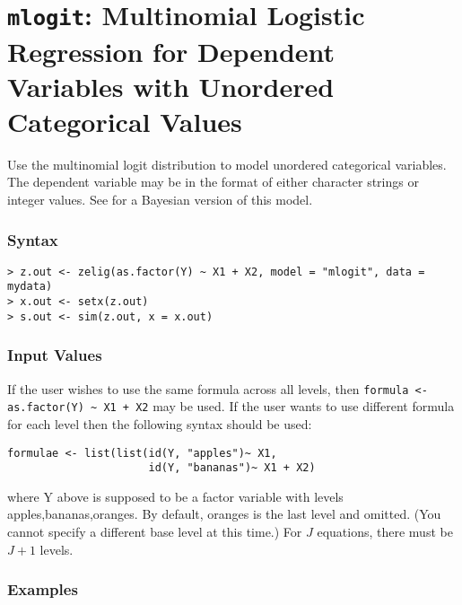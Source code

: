 \section{{\tt mlogit}: Multinomial Logistic Regression for
Dependent Variables with Unordered Categorical Values}\label{mlogit}
Use the multinomial logit distribution to model unordered categorical
variables.  The dependent variable may be in the format of either
character strings or integer values.  See 
for a Bayesian version of this model.  

\subsubsection{Syntax}

\begin{verbatim}
> z.out <- zelig(as.factor(Y) ~ X1 + X2, model = "mlogit", data = mydata)
> x.out <- setx(z.out)
> s.out <- sim(z.out, x = x.out)
\end{verbatim}

\subsubsection{Input Values}

If the user wishes to use the same formula across all levels, then 
\verb|formula <- as.factor(Y) ~ X1 + X2| may be used. 
If the user wants to use different formula for each level then the following 
syntax should be used:
\begin{verbatim}
formulae <- list(list(id(Y, "apples")~ X1, 
                      id(Y, "bananas")~ X1 + X2)
\end{verbatim}
where Y above is supposed to be a factor variable with levels {apples,bananas,oranges}.  
By default, oranges is the last level and omitted.  (You cannot
specify a different base level at this time.)  
For $J$ equations, there must be $J + 1$ levels.
 
\subsubsection{Examples} \label{ternary}

